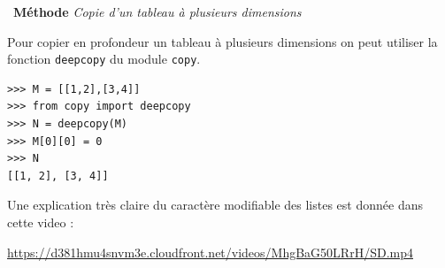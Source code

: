 \documentclass[a4paper, french, 12pt]{article}
\newenvironment{methode}[1]
{\par \medskip    \noindent  
 \begin {bclogo}[arrondi =0.1,logo=\bcoutil, marge=4,noborder = true] {~\textbf{Méthode}   {\itshape #1} }  \par}
{
\end{bclogo}
 \par \bigskip }
\begin{document}
\begin{methode}{Copie d'un tableau à plusieurs dimensions}
\medskip

Pour copier en profondeur un tableau à plusieurs dimensions on peut utiliser la fonction \lstinline{deepcopy} du module \lstinline{copy}.


\medskip

\begin{minipage}{0.95\linewidth}
\begin{lstlisting}[style=compil]  
>>> M = [[1,2],[3,4]]
>>> from copy import deepcopy
>>> N = deepcopy(M)
>>> M[0][0] = 0
>>> N
[[1, 2], [3, 4]]
\end{lstlisting}
\end{minipage}


Une explication très claire du caractère modifiable des listes est donnée dans cette video :

\begin{center}
	\url{https://d381hmu4snvm3e.cloudfront.net/videos/MhgBaG50LRrH/SD.mp4}
\end{center}

\end{methode}


\vspace*{-20pt}
\end{document}
